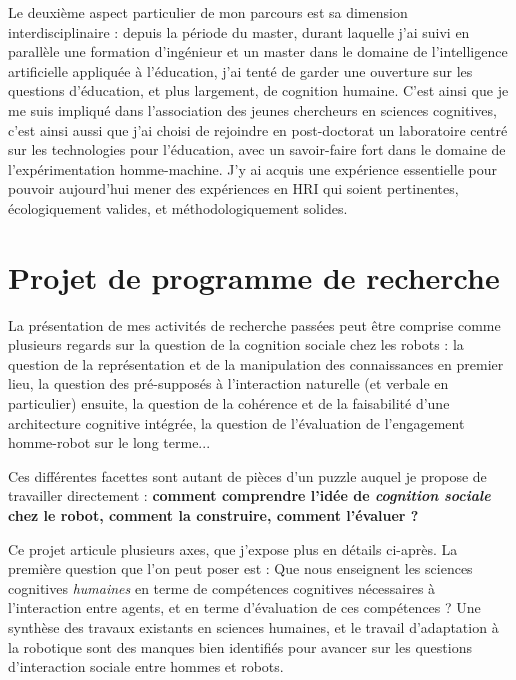 \documentclass[a4paper]{article}
\begin{document}
Le deuxième aspect particulier de mon parcours est sa dimension
interdisciplinaire : depuis la période du master, durant laquelle j'ai suivi en
parallèle une formation d'ingénieur et un master dans le domaine de
l'intelligence artificielle appliquée à l'éducation, j'ai tenté de garder une
ouverture sur les questions d'éducation, et plus largement, de cognition
humaine. C'est ainsi que je me suis impliqué dans l'association des jeunes
chercheurs en sciences cognitives, c'est ainsi aussi que j'ai choisi de
rejoindre en post-doctorat un laboratoire centré sur les technologies pour
l'éducation, avec un savoir-faire fort dans le domaine de l'expérimentation
homme-machine. J'y ai acquis une expérience essentielle pour pouvoir aujourd'hui
mener des expériences en HRI qui soient pertinentes, écologiquement valides, et
méthodologiquement solides.

\printbibliography
\clearpage


\section{Projet de programme de recherche}
\newrefsection

La présentation de mes activités de recherche passées peut être comprise comme
plusieurs regards sur la question de la cognition sociale chez les robots : la
question de la représentation et de la manipulation des connaissances en premier
lieu, la question des pré-supposés à l'interaction naturelle (et verbale en
particulier) ensuite, la question de la cohérence et de la faisabilité d'une
architecture cognitive intégrée, la question de l'évaluation de l'engagement
homme-robot sur le long terme...

Ces différentes facettes sont autant de pièces d'un puzzle auquel je propose de
travailler directement : \textbf{comment comprendre l'idée de \emph{cognition
sociale} chez le robot, comment la construire, comment l'évaluer ?}

Ce projet articule plusieurs axes, que j'expose plus en détails ci-après. La
première question que l'on peut poser est : Que nous enseignent les sciences
cognitives \emph{humaines} en terme de compétences cognitives nécessaires à
l'interaction entre agents, et en terme d'évaluation de ces compétences ? Une
synthèse des travaux existants en sciences humaines, et le travail d'adaptation
à la robotique sont des manques bien identifiés pour avancer sur les questions
d'interaction sociale entre hommes et robots.
\end{document}

